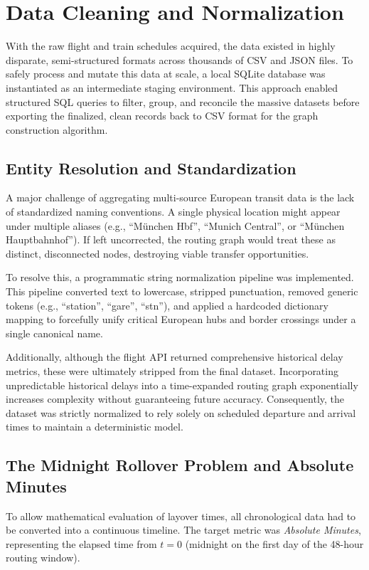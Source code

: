 \section{Data Cleaning and Normalization}
\label{sec:cleaning_normalization}
With the raw flight and train schedules acquired, the data existed in highly disparate, semi-structured formats across thousands of CSV and JSON files. To safely process and mutate this data at scale, a local SQLite database was instantiated as an intermediate staging environment. This approach enabled structured SQL queries to filter, group, and reconcile the massive datasets before exporting the finalized, clean records back to CSV format for the graph construction algorithm.

\subsection{Entity Resolution and Standardization}
\label{subsec:entity_resolution_standardization}
A major challenge of aggregating multi-source European transit data is the lack of standardized naming conventions. A single physical location might appear under multiple aliases (e.g., ``M\"unchen Hbf'', ``Munich Central'', or ``M\"unchen Hauptbahnhof''). If left uncorrected, the routing graph would treat these as distinct, disconnected nodes, destroying viable transfer opportunities.

To resolve this, a programmatic string normalization pipeline was implemented. This pipeline converted text to lowercase, stripped punctuation, removed generic tokens (e.g., ``station'', ``gare'', ``stn''), and applied a hardcoded dictionary mapping to forcefully unify critical European hubs and border crossings under a single canonical name.

Additionally, although the flight API returned comprehensive historical delay metrics, these were ultimately stripped from the final dataset. Incorporating unpredictable historical delays into a time-expanded routing graph exponentially increases complexity without guaranteeing future accuracy. Consequently, the dataset was strictly normalized to rely solely on scheduled departure and arrival times to maintain a deterministic model.

\subsection{The Midnight Rollover Problem and Absolute Minutes}
\label{subsec:midnight_rollover_absolute_minutes}
To allow mathematical evaluation of layover times, all chronological data had to be converted into a continuous timeline. The target metric was \textit{Absolute Minutes}, representing the elapsed time from $t=0$ (midnight on the first day of the 48-hour routing window).


